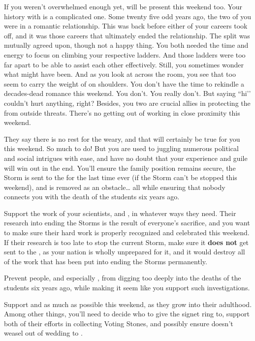 \documentclass[char]{GL2020}
\begin{document}
If you weren’t overwhelmed enough yet, \cAntiChup{\full} will be present this weekend too. Your history with \cAntiChup{} is a complicated one. Some twenty five odd years ago, the two of you were in a romantic relationship. This was back before either of your careers took off, and it was those careers that ultimately ended the relationship. The split was mutually agreed upon, though not a happy thing. You both needed the time and energy to focus on climbing your respective ladders. And those ladders were too far apart to be able to assist each other effectively. Still, you sometimes wonder what might have been. And as you look at \cAntiChup{\them} across the room, you see that \cAntiChup{\they} too seem\cAntiChup{\verbs} to carry the weight of \pEarth{} on \cAntiChup{\their} shoulders. You don’t have the time to rekindle a decades-dead romance this weekend. You don’t. You really don’t. But saying ``hi’’ couldn’t hurt anything, right? Besides, you two are crucial allies in protecting the \pTech{} from outside threats. There’s no getting out of working in close proximity this weekend.

They say there is no rest for the weary, and that will certainly be true for you this weekend. So much to do! But you are used to juggling numerous political and social intrigues with ease, and have no doubt that your experience and guile will win out in the end. You'll ensure the \cHeir{\formal} family position remains secure, the Storm is sent to the \pShip{} for the last time ever (if the Storm can’t be stopped this weekend), and \cLoud{} is removed as an obstacle\ldots{} all while ensuring that nobody connects you with the death of the students six years ago.

\begin{itemz}
    \item Support the work of your scientists, \cHeadScientist{} and \cAssistantScientist{}, in whatever ways they need. Their research into ending the Storms is the result of everyone's sacrifice, and you want to make sure their hard work is properly recognized and celebrated this weekend. If their research is too late to stop the current Storm, make sure it \textbf{does not} get sent to the \pTech{}, as your nation is wholly unprepared for it, and it would destroy all of the work that has been put into ending the Storms permanently.
    \item Prevent people, and especially \cHeir{}, from digging too deeply into the deaths of the students six years ago, while making it seem like you support such investigations.
    \item Support \cHeir{} and \cAmbition{} as much as possible this weekend, as they grow into their adulthood. Among other things, you’ll need to decide who to give the signet ring to, support both of their efforts in collecting Voting Stones, and possibly ensure \cHeir{} doesn’t weasel out of \cHeir{\their} wedding to \cChupStudent{}.
\end{itemz}
\end{document}
